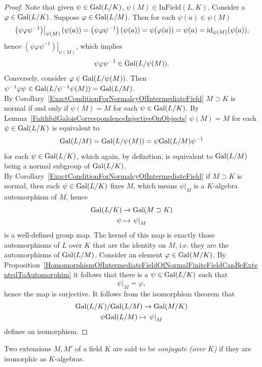 \begin{proof}
    Note that given $\psi\in \mathrm{Gal}(L/K)$, $\psi(M)\in \mathrm{InField}(L,K)$. Consider a $\varphi\in \mathrm{Gal}(L/K)$. Suppose $\varphi\in \mathrm{Gal}(L/M)$. Then for each $\psi(a)\in \psi(M)$ 
    $$
        \left.\left(\psi \varphi\psi^{-1}\right)\right|_{\psi(M)}(\psi(a))= \left(\psi \varphi\psi^{-1}\right)(\psi(a)) = \psi(\varphi(a)) =\psi(a)=\mathrm{id}_{\psi(M)}(\psi(a)),
    $$ 
    hence $\left.\left(\psi\varphi\psi^{-1}\right)\right|_{\psi(M)}$, which implies 
    $$
        \psi\varphi\psi^{-1} \in \mathrm{Gal}(L/\psi(M)).
    $$
    Conversely, consider $ \varphi \in \mathrm{Gal}(L/\psi(M))$. Then $\psi^{-1}\varphi\psi\in \mathrm{Gal}(L/\psi^{-1}\psi(M))=\mathrm{Gal}(L/M)$.\\
    By Corollary~\ref{ExactConditionForNormalcyOfIntermediateField} $M\supset K$ is normal if and only if $\psi(M) = M$ for each $\psi\in \mathrm{Gal}(L/K)$. By Lemma~\ref{FaithfulGaloisCorrespondenceInjectiveOnObjects} $\psi(M)=M$ for each $\psi\in \mathrm{Gal}(L/K)$ is equivalent to 
    $$
        \mathrm{Gal}(L/M)=\mathrm{Gal}(L/\psi(M))=\psi\mathrm{Gal}(L/M)\psi^{-1}
    $$
    for each $\psi\in \mathrm{Gal}(L/K)$, which again, by definition, is equivalent to $\mathrm{Gal}(L/M)$ being a normal subgroup of $\mathrm{Gal}(L/K)$.\\
    By Corollary~\ref{ExactConditionForNormalcyOfIntermediateField} if $M\supset K$ is normal, then each $\psi\in \mathrm{Gal}(L/K)$ fixes $M$, which means $\left.\psi\right|_M$ is a $K$-algebra automorphism of $M$, hence 
    \begin{gather*}
        \mathrm{Gal}(L/K)\rightarrow \mathrm{Gal}(M\supset K)\\
        \psi\mapsto \left.\psi\right|_{M}
    \end{gather*}
    is a well-defined group map. The kernel of this map is exactly those automorphisms of $L$ over $K$ that are the identity on $M$, i.e. they are the automorphisms of $\mathrm{Gal}(L/M)$. Consider an element $\varphi\in \mathrm{Gal}(M/K)$. By Proposition~\ref{HomomorphismOfIntermediateFieldOfNormalFiniteFieldCanBeExtentedToAutomorphim} it follows that there is a $\psi\in \mathrm{Gal}(L/K)$ such that 
    $$
        \left.\psi\right|_M = \varphi,
    $$
    hence the map is surjective. It follows from the isomorphism theorem that 
    \begin{gather*}
        \mathrm{Gal}(L/K)/\mathrm{Gal}(L/M) \rightarrow \mathrm{Gal}(M/K)\\
        \psi\mathrm{Gal}(L/M) \mapsto \left.\psi\right|_M
    \end{gather*}
    defines an isomorphism. 
\end{proof}
\begin{definition}
    Two extensions $M,M'$ of a field $K$ are said to be \emph{conjugate (over $K$)} if they are isomorphic as $K$-algebras. 
\end{definition}
